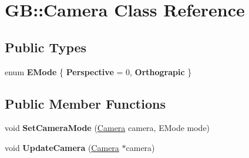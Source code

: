 \hypertarget{class_g_b_1_1_camera}{}\section{GB\+::Camera Class Reference}
\label{class_g_b_1_1_camera}
\subsection*{Public Types}
\begin{DoxyCompactItemize}
\item 
\mbox{\label{class_g_b_1_1_camera_aaeeff92e493e2438e0da06c47953cc34}} 
enum {\bfseries E\+Mode} \{ {\bfseries Perspective} = 0, 
{\bfseries Orthograpic}
 \}
\end{DoxyCompactItemize}
\subsection*{Public Member Functions}
\begin{DoxyCompactItemize}
\item 
\mbox{\label{class_g_b_1_1_camera_ae95f2dbd22ba7467a77fbf4880ff62b5}} 
void {\bfseries Set\+Camera\+Mode} (\mbox{\hyperlink{class_g_b_1_1_camera}{Camera}} camera, E\+Mode mode)
\item 
\mbox{\label{class_g_b_1_1_camera_a366016cc02088419481464beeaf00fca}} 
void {\bfseries Update\+Camera} (\mbox{\hyperlink{class_g_b_1_1_camera}{Camera}} $\ast$camera)
\end{DoxyCompactItemize}
